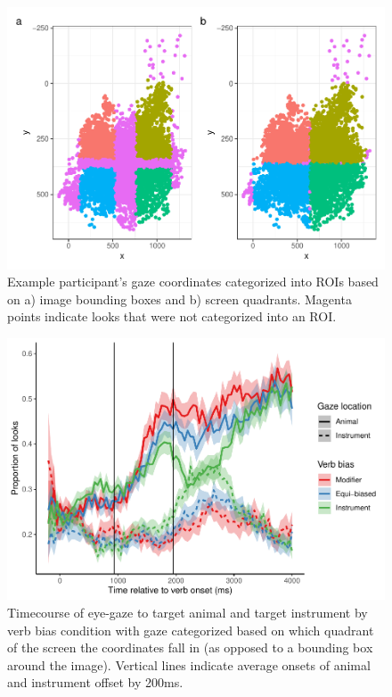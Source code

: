 \documentclass[
  man,floatsintext]{apa6}
\begin{document}
\begin{figure}
\centering
\includegraphics{manuscript_files/figure-latex/E4-example-subj-looks-ROI-1.pdf}
\caption{\label{fig:E4-example-subj-looks-ROI}Example participant's gaze coordinates categorized into ROIs based on a) image bounding boxes and b) screen quadrants. Magenta points indicate looks that were not categorized into an ROI.}
\end{figure}

\begin{figure}
\centering
\includegraphics{manuscript_files/figure-latex/E4-gaze-timecourse-fig-quadrants-1.pdf}
\caption{\label{fig:E4-gaze-timecourse-fig-quadrants}Timecourse of eye-gaze to target animal and target instrument by verb bias condition with gaze categorized based on which quadrant of the screen the coordinates fall in (as opposed to a bounding box around the image). Vertical lines indicate average onsets of animal and instrument offset by 200ms.}
\end{figure}
\end{document}
